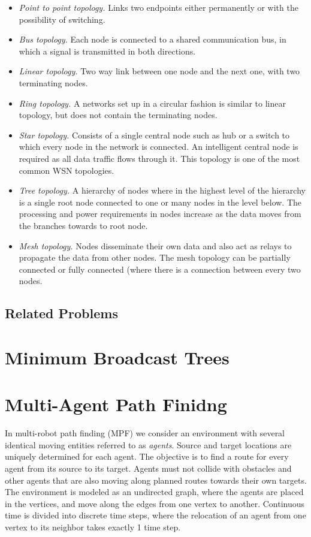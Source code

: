 \begin{itemize}
\item \emph{Point to point topology.} Links two endpoints either permanently or with the possibility of switching.
\item \emph{Bus topology.} Each node is connected to a shared communication bus, in which a signal is transmitted in both directions. 
\item \emph{Linear topology.} Two way link between one node and the next one, with two terminating nodes.
\item \emph{Ring topology.} A networks set up in a circular fashion is similar to linear topology, but does not contain the terminating nodes.
\item \emph{Star topology.} Consists of a single central node such as hub or a switch to which every node in the network is connected. 
An intelligent central node is required as all data traffic flows through it.
This topology is one of the most common WSN topologies.
\item \emph{Tree topology.} A hierarchy of nodes where in the highest level of the hierarchy is a single root node connected to one or many nodes in the level below.
The processing and power requirements in nodes increase as the data moves from the branches towards to root node.
\item \emph{Mesh topology.} Nodes disseminate their own data and also act as relays to propagate the data from other nodes.
The mesh topology can be partially connected  or fully connected (where there is a connection between every two nodes.
\end{itemize}

\subsection{Related Problems}

\section{Minimum Broadcast Trees}\label{sec:mbt}

\section{Multi-Agent Path Finidng}\label{sec:app}

In multi-robot path finding (MPF) we consider an environment with several identical moving entities referred to as 
\emph{agents}. Source and target locations are uniquely determined for each agent. The objective
is to find a route for every agent from its source to its target.
Agents must not collide with obstacles and other agents that are also moving along
planned routes towards their own targets.
The environment is modeled as an undirected graph, where the agents are placed in the vertices, and move along the edges from one vertex to another. 
Continuous time is divided into discrete time steps, where the relocation of an agent from one vertex to its neighbor takes exactly 1 time step.

